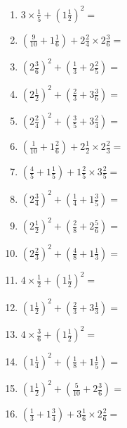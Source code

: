 \documentclass[12pt]{article}
\begin{document}
\begin{enumerate}
\item \large $ 3 \times \frac{1}{5} + (1 \frac{1}{2})^2 = $ \vspace{1.8cm}
\item \large $ (\frac{9}{10} + 1 \frac{1}{6}) + 2 \frac{2}{4} \times 2 \frac{3}{6} = $ \vspace{1.8cm}
\item \large $ (2 \frac{3}{6})^2 + (\frac{1}{3} + 2 \frac{2}{5}) = $ \vspace{1.8cm}
\item \large $ (2 \frac{1}{2})^2 + (\frac{2}{3} + 3 \frac{3}{6}) = $ \vspace{1.8cm}
\item \large $ (2 \frac{2}{4})^2 + (\frac{3}{5} + 3 \frac{2}{4}) = $ \vspace{1.8cm}
\item \large $ (\frac{1}{10} + 1 \frac{2}{6}) + 2 \frac{1}{2} \times 2 \frac{2}{3} = $ \vspace{1.8cm}
\item \large $ (\frac{4}{5} + 1 \frac{1}{5}) + 1 \frac{2}{5} \times 3 \frac{2}{5} = $ \vspace{1.8cm}
\item \large $ (2 \frac{3}{4})^2 + (\frac{1}{4} + 1 \frac{3}{5}) = $ \vspace{1.8cm}
\item \large $ (2 \frac{1}{2})^2 + (\frac{2}{8} + 2 \frac{5}{6}) = $ \vspace{1.8cm}
\item \large $ (2 \frac{2}{3})^2 + (\frac{4}{8} + 1 \frac{1}{3}) = $ \vspace{1.8cm}
\newpage
\item \large $ 4 \times \frac{1}{2} + (1 \frac{1}{2})^2 = $ \vspace{1.8cm}
\item \large $ (1 \frac{1}{2})^2 + (\frac{2}{3} + 3 \frac{1}{3}) = $ \vspace{1.8cm}
\item \large $ 4 \times \frac{3}{6} + (1 \frac{1}{2})^2 = $ \vspace{1.8cm}
\item \large $ (1 \frac{1}{4})^2 + (\frac{1}{8} + 1 \frac{1}{5}) = $ \vspace{1.8cm}
\item \large $ (1 \frac{1}{2})^2 + (\frac{5}{10} + 2 \frac{3}{6}) = $ \vspace{1.8cm}
\item \large $ (\frac{1}{3} + 1 \frac{3}{4}) + 3 \frac{1}{6} \times 2 \frac{2}{6} = $ \vspace{1.8cm}

\end{enumerate}
\end{document}
